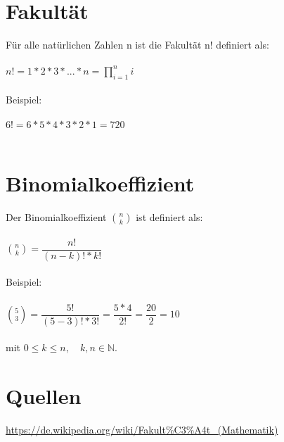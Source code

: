\newpage

\section{Fakultät}
Für alle natürlichen Zahlen n ist die Fakultät n! definiert als:\\ \\
$ n! = 1 * 2 * 3 * ... * n = \prod \limits_{i = 1}^{n}i$\\ \\
Beispiel:\\ \\
$6! = 6 * 5 * 4 * 3 * 2 * 1 = 720$ \\ \\

\section{Binomialkoeffizient}
Der Binomialkoeffizient $\binom{n}{k}$ ist definiert als:\\ \\
$\binom{n}{k} = \dfrac{n!}{(n - k)! * k!}$\\ \\
Beispiel:\\ \\
$\binom{5}{3} = \dfrac{5!}{(5 - 3)! * 3!} = \dfrac{5 * 4}{2!} = \dfrac{20}{2} = 10$\\ \\
mit $0 \le k \le n,\quad k, n \in \mathbb{N}$.

\newpage	
\section{Quellen}
 \url{https://de.wikipedia.org/wiki/Fakult\%C3\%A4t\_(Mathematik)}